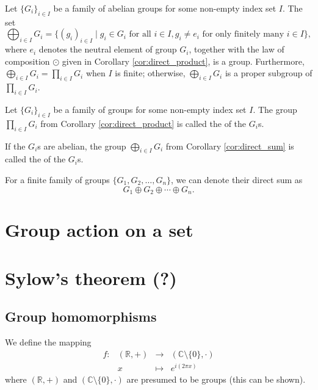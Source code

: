 \begin{cor}\label{cor:direct_sum}
Let $ \{G_i\}_{i\in I} $ be a family of abelian groups for some non-empty index set $ I $. The set
\begin{equation*}
    \bigoplus_{i\in I}G_i=\{(g_i)_{i\in I}\mid g_i\in G_i\text{ for all }i\in I, g_i\neq e_i\text{ for only finitely many }i\in I\},
\end{equation*}
where $ e_i $ denotes the neutral element of group $ G_i $, together with the law of composition $ \odot $ given in Corollary \ref{cor:direct_product}, is a group. Furthermore, $ \bigoplus_{i\in I}G_i=\prod_{i\in I}G_i $ when $ I $ is finite; otherwise, $ \bigoplus_{i\in I}G_i $ is a proper subgroup of $ \prod_{i\in I}G_i $.
\end{cor}

\begin{defn}
Let $ \{G_i\}_{i\in I} $ be a family of groups for some non-empty index set $ I $. The group $ \prod_{i\in I}G_i $ from Corollary \ref{cor:direct_product} is called the  of the $ G_i $s.

If the $ G_i $s are abelian, the group $ \bigoplus_{i\in I}G_i $ from Corollary \ref{cor:direct_sum} is called the  of the $ G_i $s.
\end{defn}

For a finite family of groups $ \{G_1,G_2,\ldots,G_n\} $, we can denote their direct sum as
\begin{equation*}
    G_1\oplus G_2\oplus\cdots\oplus G_n.
\end{equation*}

\section{Group action on a set}

\section{Sylow's theorem (?)}


\subsection*{Group homomorphisms}

We define the mapping
\begin{equation*}
    \begin{array}{rrcl}
        f: & (\mathbb{R},+) & \to & (\mathbb{C}\setminus\{0\},\cdot) \\
        & x & \mapsto & e^{i(2\pi x)} 
    \end{array}
\end{equation*}
where $ (\mathbb{R},+) $ and $ (\mathbb{C}\setminus\{0\},\cdot) $ are presumed to be groups (this can be shown).

